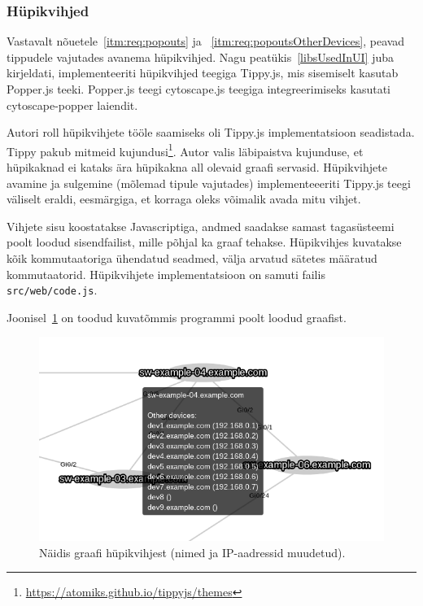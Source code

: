 \documentclass[12pt]{article}
\begin{document}
\subsubsection{Hüpikvihjed}
Vastavalt nõuetele~\ref{itm:req:popouts} ja ~\ref{itm:req:popoutsOtherDevices}, peavad tippudele
vajutades avanema hüpikvihjed.
Nagu peatükis~\ref{libsUsedInUI} juba kirjeldati, implementeeriti hüpikvihjed teegiga Tippy.js, mis
sisemiselt kasutab Popper.js teeki.
Popper.js teegi cytoscape.js teegiga integreerimiseks kasutati cytoscape-popper laiendit.

Autori roll hüpikvihjete tööle saamiseks oli Tippy.js implementatsioon seadistada.
Tippy pakub mitmeid kujundusi\footnote{\url{https://atomiks.github.io/tippyjs/themes}}.
Autor valis läbipaistva kujunduse, et hüpikaknad ei kataks ära hüpikakna all olevaid graafi
servasid.
Hüpikvihjete avamine ja sulgemine (mõlemad tipule vajutades) implementeeeriti Tippy.js teegi
väliselt eraldi, eesmärgiga, et korraga oleks võimalik avada mitu vihjet.

Vihjete sisu koostatakse Javascriptiga, andmed saadakse samast tagasüsteemi poolt loodud
sisendfailist, mille põhjal ka graaf tehakse.
Hüpikvihjes kuvatakse kõik kommutaatoriga ühendatud seadmed, välja arvatud sätetes määratud
kommutaatorid.
Hüpikvihjete implementatsioon on samuti failis \texttt{src/web/code.js}.

Joonisel~\ref{fig:tooltip} on toodud kuvatõmmis programmi poolt loodud graafist.

\begin{figure} [ht] %
\begin{center}
\includegraphics[width=1\textwidth]{tooltip}
    \caption{Näidis graafi hüpikvihjest (nimed ja IP-aadressid muudetud).}
\label{fig:tooltip}
\end{center}
\end{figure}
\end{document}
